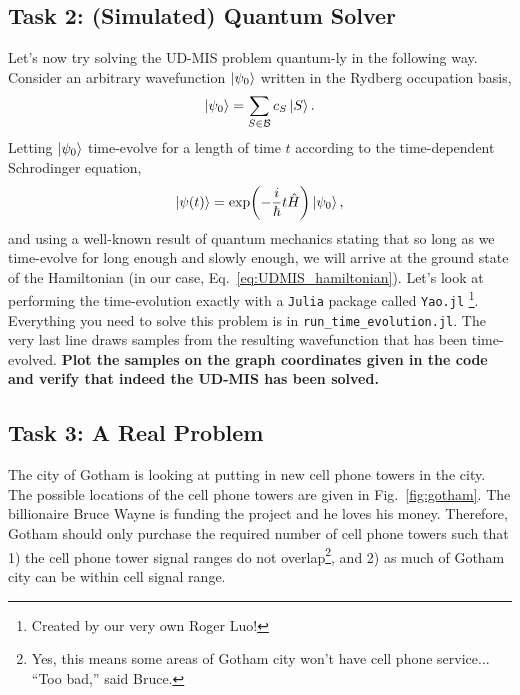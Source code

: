 \documentclass[12pt]{article}
\begin{document}
\subsection*{Task 2: (Simulated) Quantum Solver}

Let's now try solving the UD-MIS problem quantum-ly in the following way.
Consider an arbitrary wavefunction $\ket{\psi_0}$ written in the Rydberg occupation basis,
\begin{equation}
	\ket{\psi_0} = \sum_{S \in \mathcal{B}} c_S \ket{S}.
\end{equation}
Letting $\ket{\psi_0}$ time-evolve for a length of time $t$ according to the time-dependent Schrodinger equation,
\begin{equation}
	\ket{\psi(t)} = \exp(-\frac{i}{\hbar} t \hat{H}) \ket{\psi_0},
\end{equation}
and using a well-known result of quantum mechanics stating that so long as we time-evolve for long enough and slowly enough, we will arrive at the ground state of the Hamiltonian (in our case, Eq.~\ref{eq:UDMIS_hamiltonian}).
Let's look at performing the time-evolution exactly with a \texttt{Julia} package called \texttt{Yao.jl} \cite{luo_yaojl_2020}\footnote{Created by our very own Roger Luo!}.
Everything you need to solve this problem is in \texttt{run\_time\_evolution.jl}.
The very last line draws samples from the resulting wavefunction that has been time-evolved.
{\bf Plot the samples on the graph coordinates given in the code and verify that indeed the UD-MIS has been solved.}

\subsection*{Task 3: A Real Problem}

The city of Gotham is looking at putting in new cell phone towers in the city.
The possible locations of the cell phone towers are given in Fig.~\ref{fig:gotham}.
The billionaire Bruce Wayne is funding the project and he loves his money. 
Therefore, Gotham should only purchase the required number of cell phone towers such that 1) the cell phone tower signal ranges do not overlap\footnote{Yes, this means some areas of Gotham city won't have cell phone service... ``Too bad,'' said Bruce.}, and 2) as much of Gotham city can be within cell signal range. 
\end{document}
